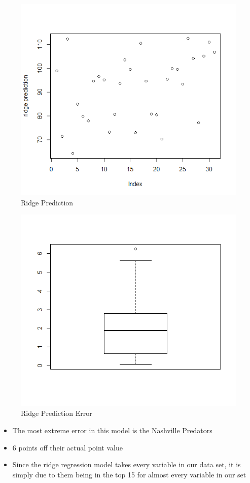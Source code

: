 \documentclass{beamer}
\begin{document}
\begin{frame}
	\begin{figure}
		\centering
		\includegraphics[width=0.7\linewidth]{"Ridge Prediction"}
		\caption{Ridge Prediction}
		\label{fig:Ridge Prediction}
	\end{figure}
\end{frame}
\begin{frame}
	\begin{figure}
		\centering
		\includegraphics[width=0.7\linewidth]{RidgePredictionError}
		\caption{Ridge Prediction Error}
		\label{fig:ridgepredictionerror}
	\end{figure}
\end{frame}
\begin{frame}
	\begin{itemize}
		\item The most extreme error in this model is the Nashville Predators
		\item 6 points off their actual point value
		\item Since the ridge regression model takes every variable in our data set, it is simply due to them being in the top 15 for almost every variable in our set
	\end{itemize}
\end{frame}
\end{document}
